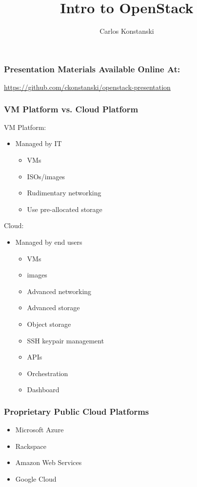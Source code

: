 \documentclass[helvetica,english,utf8,notitle,nologo]{beamer}
\begin{document}
\title{Intro to OpenStack}
\author{Carlos Konstanski}

\frame{\titlepage}

\begin{frame}
  \frametitle{Presentation Materials Available Online At:}
  \href{url}{https://github.com/ckonstanski/openstack-presentation}
\end{frame}

\begin{frame}
  \frametitle{VM Platform vs. Cloud Platform}
  VM Platform:
  \begin{itemize}
  \item Managed by IT
    \begin{itemize}
    \item VMs
    \item ISOs/images
    \item Rudimentary networking
    \item Use pre-allocated storage
    \end{itemize}
  \end{itemize}
  Cloud:
  \begin{itemize}
  \item Managed by end users
    \begin{itemize}
    \item VMs
    \item images
    \item Advanced networking
    \item Advanced storage
    \item Object storage
    \item SSH keypair management
    \item APIs
    \item Orchestration
    \item Dashboard
    \end{itemize}
  \end{itemize}
\end{frame}

\begin{frame}
  \frametitle{Proprietary Public Cloud Platforms}
  \begin{itemize}
  \item Microsoft Azure
  \item Rackspace
  \item Amazon Web Services
  \item Google Cloud
  \end{itemize}
\end{frame}
\end{document}
